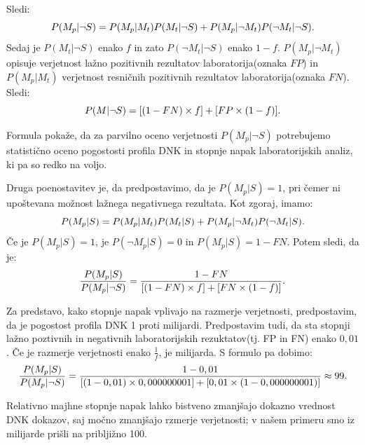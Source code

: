 \documentclass[12pt,a4paper]{amsart}
\theoremstyle{definition} %
\theoremstyle{plain} %
\begin{document}
Sledi: 
\[P(M_p \lvert \neg S) = P(M_p \lvert M_t)P(M_t \lvert \neg S) + P(M_p \lvert \neg M_t)P(\neg M_t \lvert \neg S). \vspace{3mm}\] 
Sedaj je $P(M_t \lvert \neg S)$ enako $f$ in zato $P(\neg M_t \lvert \neg S)$ enako $1-f$. $P(M_p \lvert \neg M_t)$ opisuje verjetnost lažno 
pozitivnih rezultatov laboratorija(oznaka $FP$) in $P(M_p \lvert M_t)$ verjetnost resničnih pozitivnih rezultatov laboratorija(oznaka $FN$). 
Sledi: \vspace{2mm}
\[P(M \lvert \neg S) = [(1 - FN) \times f] + [FP \times (1 - f)]. \vspace{3mm}\]

Formula pokaže, da za parvilno oceno verjetnosti $P(M_p \lvert \neg S)$ potrebujemo statistično oceno pogostosti profila DNK in stopnje napak 
laboratorijskih analiz, ki pa so redko na voljo. \vspace{3mm}

Druga poenostavitev je, da predpostavimo, da je $P(M_p \lvert S) = 1$, pri čemer ni upoštevana možnost lažnega negativnega rezultata. Kot zgoraj, imamo: \vspace{3mm}
\[P(M_p \lvert S) = P(M_p \lvert M_t)P(M_t \lvert S) + P(M_p \lvert \neg M_t)P(\neg M_t \lvert S). \vspace{3mm}\] 
Če je $P(M_p \lvert S) = 1$, je $P(\neg M_p \lvert S) = 0$ in $P(M_p \lvert S) = 1 - FN$. Potem sledi, da je: \vspace{3mm}
\[\frac{P(M_p \lvert S)}{P(M_p \lvert \neg S)} = \frac{1 - FN}{[(1 - FN) \times f] + [FN \times (1 - f)]}. \vspace{3mm}\]

Za predstavo, kako stopnje napak vplivajo na razmerje verjetnosti, predpostavim, da je pogostost profila DNK 1 proti milijardi. Predpostavim 
tudi, da sta stopnji lažno poztivnih in negativnih laboratorijskih rezuktatov(tj. FP in FN) enako $0,01$. Če je razmerje verjetnosti enako 
$\frac{1}{f}$, je milijarda. S formulo pa dobimo: \vspace{3mm}
\[\frac{P(M_p \lvert S)}{P(M_p \lvert \neg S)} = \frac{1 - 0,01}{[(1 - 0,01) \times 0,000000001] + [0,01 \times (1 - 0,000000001)]} \approx 99. \vspace{3mm}\]

Relativno majhne stopnje napak lahko bistveno zmanjšajo dokazno vrednost DNK dokazov, saj močno zmanjšajo rzmerje verjetnosti; v našem primeru 
smo iz milijarde prišli na pribljižno 100. \\\\
\end{document}
